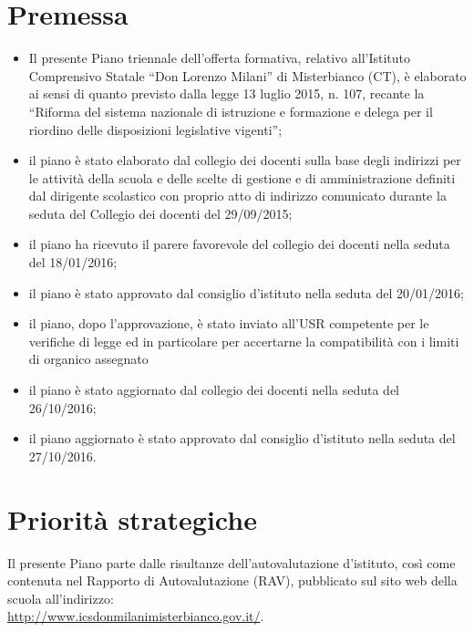 \documentclass[12pt,a4paper,oneside]{memoir}
\begin{document}


\clearpage



\chapter*{Premessa}

\begin{itemize}
\item Il presente Piano triennale dell'offerta formativa, relativo all'Istituto Comprensivo Statale ``Don Lorenzo Milani'' di Misterbianco (CT), è elaborato ai sensi di quanto previsto dalla legge 13 luglio 2015, n. 107, recante la ``Riforma del sistema nazionale di istruzione e formazione e delega per il riordino delle disposizioni legislative vigenti'';
\item il piano è stato elaborato dal collegio dei docenti sulla base degli indirizzi per le attività della scuola e delle scelte di gestione e di amministrazione definiti dal dirigente scolastico con proprio atto di indirizzo comunicato durante la seduta del Collegio dei docenti del 29/09/2015;
\item il piano ha ricevuto il parere favorevole del collegio dei docenti nella seduta del 18/01/2016;
\item il piano è stato approvato dal consiglio d'istituto nella seduta del 20/01/2016;
\item il piano, dopo l'approvazione, è stato inviato all'USR competente per le verifiche di legge ed in particolare per accertarne la compatibilità con i limiti di organico assegnato
\item il piano è stato aggiornato dal collegio dei docenti nella seduta del 26/10/2016;
\item il piano aggiornato è stato approvato dal consiglio d'istituto nella seduta del 27/10/2016.
\end{itemize}

\tableofcontents* %

\chapter{Priorità strategiche}
Il presente Piano parte dalle risultanze dell'autovalutazione d'istituto, così come contenuta nel Rapporto di Autovalutazione (RAV), 
pubblicato sul sito web della scuola all'indirizzo:\\
\url{http://www.icsdonmilanimisterbianco.gov.it/}.\\
\end{document}
